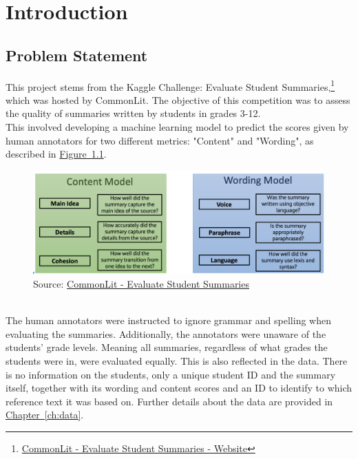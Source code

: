 \chapter{Introduction}
\label{ch:introduction}

\section{Problem Statement}
This project stems from the Kaggle Challenge: Evaluate Student Summaries,\footnote{\href{https://www.kaggle.com/competitions/commonlit-evaluate-student-summaries}{CommonLit - Evaluate Student Summaries - Website}} which was hosted by CommonLit. The objective of this competition was to assess the quality of summaries written by students in grades 3-12.\\
This involved developing a machine learning model to predict the scores given by human annotators for two different metrics: "Content" and "Wording", as described in \hyperref[fig:content-and-wording]{Figure~\ref{fig:content-and-wording}}.\\
\begin{figure}[h]
\includegraphics[keepaspectratio, width=\textwidth]{img/content_wording.png}
\caption[Description of Content and Wording]{Source: \href{https://www.kaggle.com/competitions/commonlit-evaluate-student-summaries/discussion/424402\#2349973}{CommonLit - Evaluate Student Summaries}}
\label{fig:content-and-wording}
\end{figure}\\
The human annotators were instructed to ignore grammar and spelling when evaluating the summaries. Additionally, the annotators were unaware of the students' grade levels. Meaning all summaries, regardless of what grades the students were in, were evaluated equally. This is also reflected in the data. There is no information on the students, only a unique student ID and the summary itself, together with its wording and content scores and an ID to identify to which reference text it was based on. Further details about the data are provided in \hyperref[ch:data]{Chapter~\ref{ch:data}}.

